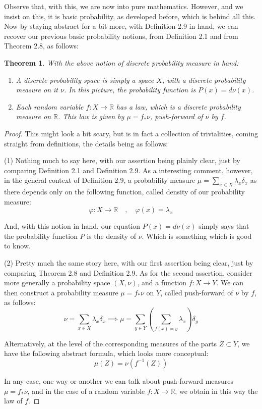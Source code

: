 \documentclass[12pt]{amsbook}
\newtheorem{theorem}{Theorem}[chapter]
\begin{document}
Observe that, with this, we are now into pure mathematics. However, and we insist on this, it is basic probability, as developed before, which is behind all this. Now by staying abstract for a bit more, with Definition 2.9 in hand, we can recover our previous basic probability notions, from Definition 2.1 and from Theorem 2.8, as follows:

\begin{theorem}
With the above notion of discrete probability measure in hand:
\begin{enumerate}
\item A discrete probability space is simply a space $X$, with a discrete probability measure on it $\nu$. In this picture, the probability function is $P(x)=d\nu(x)$.

\item Each random variable $f:X\to\mathbb R$ has a law, which is a discrete probability measure on $\mathbb R$. This law is given by $\mu=f_*\nu$, push-forward of $\nu$ by $f$.
\end{enumerate}
\end{theorem}

\begin{proof}
This might look a bit scary, but is in fact a collection of trivialities, coming straight from definitions, the details being as follows:

\medskip

(1) Nothing much to say here, with our assertion being plainly clear, just by comparing Definition 2.1 and Definition 2.9. As a interesting comment, however, in the general context of Definition 2.9, a probability measure $\mu=\sum_{x\in X}\lambda_x\delta_x$ as there depends only on the following function, called density of our probability measure:
$$\varphi:X\to\mathbb R\quad,\quad \varphi(x)=\lambda_x$$

And, with this notion in hand, our equation $P(x)=d\nu(x)$ simply says that the probability function $P$ is the density of $\nu$. Which is something which is good to know.

\medskip

(2) Pretty much the same story here, with our first assertion being clear, just by comparing Theorem 2.8 and Definition 2.9. As for the second assertion, consider more generally a probability space $(X,\nu)$, and a function $f:X\to Y$. We can then construct a probability measure $\mu=f_*\nu$ on $Y$, called push-forward of $\nu$ by $f$, as follows:
$$\nu=\sum_{x\in X}\lambda_x\delta_x\implies
\mu=\sum_{y\in Y}\left(\sum_{f(x)=y}\lambda_x\right)\delta_y$$

Alternatively, at the level of the corresponding measures of the parts $Z\subset Y$, we have the following abstract formula, which looks more conceptual:
$$\mu(Z)=\nu(f^{-1}(Z))$$

In any case, one way or another we can talk about push-forward measures $\mu=f_*\nu$, and in the case of a random variable $f:X\to\mathbb R$, we obtain in this way the law of $f$.
\end{proof}
\end{document}
